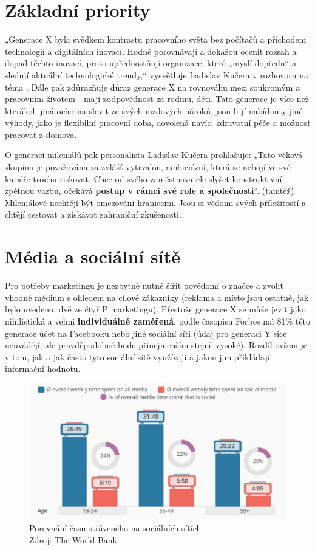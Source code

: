 \section{Základní priority}
„Generace X byla svědkem kontrastu pracovního světa bez počítačů a příchodem technologií a digitálních inovací. Hodně porovnávají a dokážou ocenit rozsah a dopad těchto inovací, proto upřednostňují organizace, které „myslí dopředu“ a sledují aktuální technologické trendy,“ vysvětluje Ladislav Kučera v rozhovoru na téma .\cite{idnes2018generacezamestancu} Dále pak zdůrazňuje důraz generace X na rovnováhu mezi soukromým a pracovním životem - mají zodpovědnost za rodinu, děti. Tato generace je více než kterákoli jiná ochotna slevit ze svých mzdových nároků, jsou-li jí nabídnuty jiné výhody, jako je flexibilní pracovní doba, dovolená navíc, zdravotní péče a možnost pracovat z domova.

O generaci mileniálů pak personalista Ladislav Kučera prohlašuje: „Tato věková skupina je považována za zvlášť vytrvalou, ambiciózní, která se nebojí ve své kariéře trochu riskovat. Chce od svého zaměstnavatele slyšet konstruktivní zpětnou vazbu, očekává \textbf{postup v rámci své role a společnosti}“. (tamtéž)
Mileniálové nechtějí být omezováni hranicemi. Jsou si vědomi svých příležitostí a chtějí cestovat a získávat zahraniční zkušenosti.

\section{Média a sociální sítě}
Pro potřeby marketingu je nezbytně nutné šířit povědomí o značce a zvolit vhodné médium s ohledem na cílové zákazníky (reklama a místo jsou ostatně, jak bylo uvedeno, dvě ze čtyř P marketingu).
Přestože generace X se může jevit jako nihilistická a velmi \textbf{individuálně zaměřená}, podle časopisu Forbes má 81\rm \% této generace účet na Facebooku nebo jiné sociální síti\cite{forbes2019generationX} (údaj pro generaci Y sice neuvádějí, ale pravděpodobně bude přinejmenším stejně vysoké). Rozdíl ovšem je v tom, jak a jak často tyto sociální sítě využívají a jakou jim přikládají informační hodnotu.


\medskip
\begin{figure}[htbp!]
    \centering
    \includegraphics[width=.88\textwidth]{assets/gen-xy-time-spend-on-social-media.png}
    \caption[Porovnání času stráveného na sociálních sítích]{Porovnání času stráveného na sociálních sítích \\ Zdroj: The World Bank\protect\footnotemark }
    \label{fig:cas-na-socialnich-sitich}
\end{figure}

